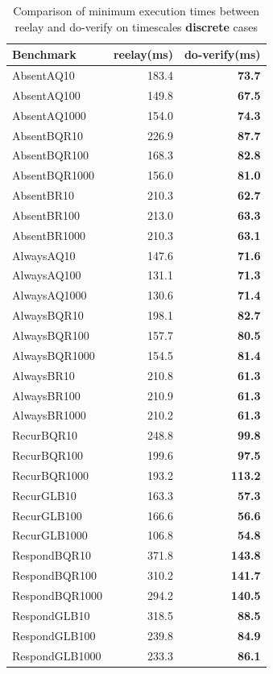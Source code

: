 \documentclass[a4paper,12pt]{report}
\begin{document}
\begin{table}[ht]
\centering
\footnotesize
\begin{tabular}{lrr}
\toprule
\textbf{Benchmark} & \textbf{reelay(ms)} & \textbf{do-verify(ms)} \\
\midrule
AbsentAQ10 & 183.4 & \textbf{73.7} \\
AbsentAQ100 & 149.8 & \textbf{67.5} \\
AbsentAQ1000 & 154.0 & \textbf{74.3} \\
AbsentBQR10 & 226.9 & \textbf{87.7} \\
AbsentBQR100 & 168.3 & \textbf{82.8} \\
AbsentBQR1000 & 156.0 & \textbf{81.0} \\
AbsentBR10 & 210.3 & \textbf{62.7} \\
AbsentBR100 & 213.0 & \textbf{63.3} \\
AbsentBR1000 & 210.3 & \textbf{63.1} \\
AlwaysAQ10 & 147.6 & \textbf{71.6} \\
AlwaysAQ100 & 131.1 & \textbf{71.3} \\
AlwaysAQ1000 & 130.6 & \textbf{71.4} \\
AlwaysBQR10 & 198.1 & \textbf{82.7} \\
AlwaysBQR100 & 157.7 & \textbf{80.5} \\
AlwaysBQR1000 & 154.5 & \textbf{81.4} \\
AlwaysBR10 & 210.8 & \textbf{61.3} \\
AlwaysBR100 & 210.9 & \textbf{61.3} \\
AlwaysBR1000 & 210.2 & \textbf{61.3} \\
RecurBQR10 & 248.8 & \textbf{99.8} \\
RecurBQR100 & 199.6 & \textbf{97.5} \\
RecurBQR1000 & 193.2 & \textbf{113.2} \\
RecurGLB10 & 163.3 & \textbf{57.3} \\
RecurGLB100 & 166.6 & \textbf{56.6} \\
RecurGLB1000 & 106.8 & \textbf{54.8} \\
RespondBQR10 & 371.8 & \textbf{143.8} \\
RespondBQR100 & 310.2 & \textbf{141.7} \\
RespondBQR1000 & 294.2 & \textbf{140.5} \\
RespondGLB10 & 318.5 & \textbf{88.5} \\
RespondGLB100 & 239.8 & \textbf{84.9} \\
RespondGLB1000 & 233.3 & \textbf{86.1} \\
\bottomrule
\end{tabular}
\caption{\small Comparison of minimum execution times between reelay and do-verify on timescales \textbf{discrete} cases}
\label{tab:discrete_timescales}
\end{table}
\end{document}
